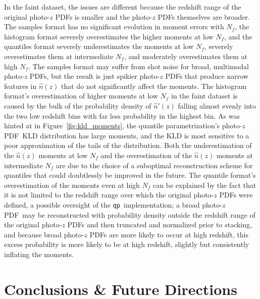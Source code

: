 \documentclass[\docopts]{\docclass}
\newcommand{\qp}{\texttt{qp}}
\newcommand{\pz}{photo-$z$ PDF}
\newcommand{\ssdata}{faint\xspace}
\begin{document}
In the \ssdata dataset, the issues are different because the redshift range of 
the original \pz s is smaller and the \pz s themselves are broader.
The samples format has no significant evolution in moment errors with $N_{f}$, 
the histogram format severely overestimates the higher moments at low $N_{f}$, 
and the quantiles format severely underestimates the moments at low $N_{f}$, 
severely overestimates them at intermediate $N_{f}$, and moderately 
overestimates them at high $N_{f}$.
The samples format may suffer from shot noise for broad, multimodal \pz s, but 
the result is just spikier \pz s that produce narrow features in $\hat{n}(z)$ 
that do not significantly affect the moments.
The histogram format's overestimation of higher moments at low $N_{f}$ in the 
\ssdata dataset is caused by the bulk of the probability density of 
$\hat{n}'(z)$ falling almost evenly into the two low redshift bins with far 
less probability in the highest bin.
As was hinted at in Figure~\ref{fig:kld_moments}, the quantile 
parametrization's \pz\ KLD distribution has large moments, and the KLD is most 
sensitive to a poor approximation of the tails of the distribution.
Both the underestimation of the $\hat{n}(z)$ moments at low $N_{f}$ and the 
overestimation of the $\hat{n}(z)$ moments at intermediate $N_{f}$ are due to 
the choice of a suboptimal reconstruction scheme for quantiles that could 
doubtlessly be improved in the future.
The quantile format's overestimation of the moments even at high $N_{f}$ can be 
explained by the fact that it is not limited to the redshift range over which 
the original \pz s were defined, a possible oversight of the \qp\ 
implementation; a broad \pz\ may be reconstructed with probability density 
outside the redshift range of the original \pz s and then truncated and 
normalized prior to stacking, and because broad \pz s are more likely to occur 
at high redshift, this excess probability is more likely to be at high 
redshift, slightly but consistently inflating the moments.


\section{Conclusions \& Future Directions}
\label{sec:conclusions}
\end{document}

